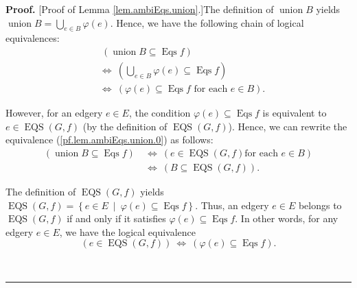 \documentclass[numbers=enddot,12pt,final,onecolumn,notitlepage]{scrartcl}%
\theoremstyle{definition}
\newenvironment{proof}[1][Proof]{\noindent\textbf{#1.} }{\ \rule{0.5em}{0.5em}}
\newenvironment{verlong}{}{}
\newenvironment{vershort}{}{}
\let\bigcupnonlimits\bigcup
\renewcommand{\bigcup}{\bigcupnonlimits\limits}
\begin{document}
\begin{proof}
[Proof of Lemma \ref{lem.ambiEqs.union}.]The definition of
$\operatorname*{union}B$ yields $\operatorname*{union}B=\bigcup_{e\in
B}\varphi\left(  e\right)  $. Hence, we have the following chain of logical
equivalences:%
\begin{align}
&  \ \left(  \operatorname*{union}B\subseteq\operatorname*{Eqs}f\right)
\nonumber\\
&  \Longleftrightarrow\ \left(  \bigcup_{e\in B}\varphi\left(  e\right)
\subseteq\operatorname*{Eqs}f\right) \nonumber\\
&  \Longleftrightarrow\ \left(  \varphi\left(  e\right)  \subseteq
\operatorname*{Eqs}f\text{ for each }e\in B\right)  .
\label{pf.lem.ambiEqs.union.0}%
\end{align}


\begin{vershort}
However, for an edgery $e\in E$, the condition $\varphi\left(  e\right)
\subseteq\operatorname*{Eqs}f$ is equivalent to $e\in\operatorname*{EQS}%
\left(  G,f\right)  $ (by the definition of $\operatorname*{EQS}\left(
G,f\right)  $). Hence, we can rewrite the equivalence
(\ref{pf.lem.ambiEqs.union.0}) as follows:%
\begin{align*}
\left(  \operatorname*{union}B\subseteq\operatorname*{Eqs}f\right)  \  &
\Longleftrightarrow\ \left(  e\in\operatorname*{EQS}\left(  G,f\right)  \text{
for each }e\in B\right) \\
&  \Longleftrightarrow\ \left(  B\subseteq\operatorname*{EQS}\left(
G,f\right)  \right)  .
\end{align*}

\end{vershort}

\begin{verlong}
The definition of $\operatorname*{EQS}\left(  G,f\right)  $ yields
$\operatorname*{EQS}\left(  G,f\right)  =\left\{  e\in E\ \mid\ \varphi\left(
e\right)  \subseteq\operatorname*{Eqs}f\right\}  $. Thus, an edgery $e\in E$
belongs to $\operatorname*{EQS}\left(  G,f\right)  $ if and only if it
satisfies $\varphi\left(  e\right)  \subseteq\operatorname*{Eqs}f$. In other
words, for any edgery $e\in E$, we have the logical equivalence%
\begin{equation}
\left(  e\in\operatorname*{EQS}\left(  G,f\right)  \right)
\ \Longleftrightarrow\ \left(  \varphi\left(  e\right)  \subseteq
\operatorname*{Eqs}f\right)  . \label{pf.lem.ambiEqs.union.1}%
\end{equation}



\end{verlong}
\end{proof}
\end{document}
